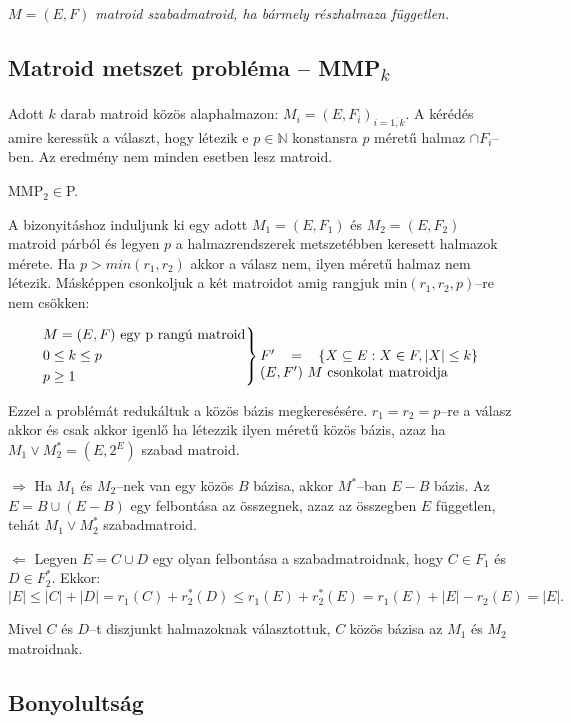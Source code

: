 \vspace{0.4cm}
\emph{$M=(E,F)$ matroid szabadmatroid, ha bármely részhalmaza független.}

\subsection{\texorpdfstring{Matroid metszet probléma -- MMP\textsubscript{$k$}}
			{Matroid metszet probléma -- MMPk}}

Adott $k$ darab matroid közös alaphalmazon: $M_i=(E,F_i)_{i=\overline{1,k}}$. A
kérédés amire keressük a választ, hogy létezik e $p \in \mathbb{N}$ konstansra
$p$ méretű halmaz $\cap F_i$--ben. Az eredmény nem minden esetben lesz matroid.

\vspace{0.4cm}
MMP$_2 \in $P.
\vspace{0.4cm}

A bizonyitáshoz induljunk ki egy adott $M_1=(E,F_1)$ és $M_2=(E,F_2)$ matroid
párból és legyen $p$ a halmazrendszerek metszetébben keresett halmazok mérete.
Ha $p>min(r_1, r_2)$ akkor a válasz nem, ilyen méretű halmaz nem létezik.
Másképpen csonkoljuk a két matroidot amig rangjuk min$(r_1,r_2, p)$--re nem
csökken:

\[ \begin{rcases}
M=(E,F) \mbox{ egy p rangú matroid} \\
0 \leq k \leq p \\ 
p \geq 1 
\end{rcases} \parbox[t]{5.5cm}
{$F' = \left\{ X \subseteq E: X \in F, |X| \leq k \right\}$ 
$(E,F')~M$ csonkolat matroidja} \]

Ezzel a problémát redukáltuk a közös bázis megkeresésére. $r_1=r_2=p$--re a
válasz akkor és csak akkor igenlő ha létezzik ilyen méretű közös bázis, azaz ha
$M_1 \vee M_2^*=(E,2^E)$ szabad matroid.

$\Rightarrow$ Ha $M_1$ és $M_2$--nek van egy közös $B$ bázisa, akkor $M^*$--ban
$E-B$ bázis. Az $E=B \cup (E-B)$ egy felbontása az összegnek, azaz az összegben
$E$ független, tehát $M_1 \vee M_2^*$ szabadmatroid.

$\Leftarrow$ Legyen $E=C \cup D$ egy olyan felbontása a szabadmatroidnak, hogy
$C \in F_1$ és $D \in F_2^*$. Ekkor:
\[|E| \leq |C| + |D| = r_1(C) + r_2^*(D) \leq r_1(E)+r_2^*(E) = r_1(E) + |E| - r_2(E)=|E|. \]

Mivel $C$ és $D$--t diszjunkt halmazoknak választottuk, $C$ közös bázisa az $M_1$ és
$M_2$ matroidnak.

\subsection{Bonyolultság}

